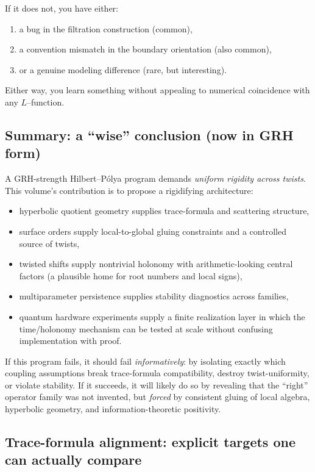 \documentclass[11pt,oneside]{amsbook}
\numberwithin{equation}{section}
\theoremstyle{plain}
\theoremstyle{definition}
\theoremstyle{remark}
\begin{document}
If it does not, you have either:
\begin{enumerate}[label=(\roman*)]
\item a bug in the filtration construction (common),
\item a convention mismatch in the boundary orientation (also common),
\item or a genuine modeling difference (rare, but interesting).
\end{enumerate}
Either way, you learn something without appealing to numerical coincidence with any $L$--function.




\subsection{Summary: a ``wise'' conclusion (now in GRH form)}
\label{sec:HP_summary}

A GRH-strength Hilbert--Pólya program demands \emph{uniform rigidity across twists}.
This volume's contribution is to propose a rigidifying architecture:
\begin{itemize}
\item hyperbolic quotient geometry supplies trace-formula and scattering structure,
\item surface orders supply local-to-global gluing constraints and a controlled source of twists,
\item twisted shifts supply nontrivial holonomy with arithmetic-looking central factors (a plausible home for root numbers and local signs),
\item multiparameter persistence supplies stability diagnostics across families,
\item quantum hardware experiments supply a finite realization layer in which the time/holonomy mechanism can be tested at scale without confusing implementation with proof.
\end{itemize}

If this program fails, it should fail \emph{informatively}:
by isolating exactly which coupling assumptions break trace-formula compatibility, destroy twist-uniformity, or violate stability.
If it succeeds, it will likely do so by revealing that the ``right'' operator family was not invented, but \emph{forced} by consistent gluing of local algebra, hyperbolic geometry, and information-theoretic positivity.

\subsection{Trace-formula alignment: explicit targets one can actually compare}
\label{sec:trace_formula_targets}
\end{document}
